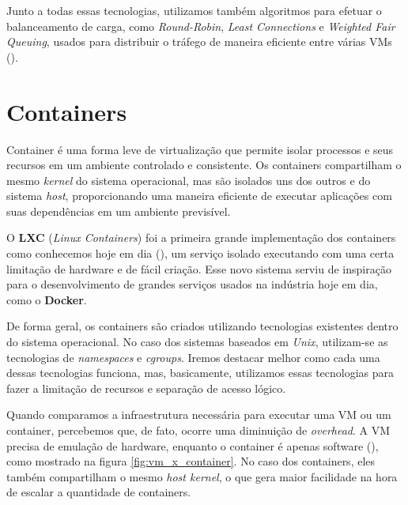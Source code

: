 Junto a todas essas tecnologias, utilizamos também algoritmos para efetuar o balanceamento de carga, como \textit{Round-Robin}, \textit{Least Connections} e \textit{Weighted Fair Queuing}, usados para distribuir o tráfego de maneira eficiente entre várias VMs (\cite{dong2012high}).


\section{Containers}

Container é uma forma leve de virtualização que permite isolar processos e seus recursos em um ambiente controlado e consistente. Os containers compartilham o mesmo \textit{kernel} do sistema operacional, mas são isolados uns dos outros e do sistema \textit{host}, proporcionando uma maneira eficiente de executar aplicações com suas dependências em um ambiente previsível.

O \textbf{LXC} (\textit{Linux Containers}) foi a primeira grande implementação dos containers como conhecemos hoje em dia (\cite{HistoryOfCloudByIBM}), um serviço isolado executando com uma certa limitação de hardware e de fácil criação. Esse novo sistema serviu de inspiração para o desenvolvimento de grandes serviços usados na indústria hoje em dia, como o \textbf{Docker}.

De forma geral, os containers são criados utilizando tecnologias existentes dentro do sistema operacional. No caso dos sistemas baseados em \textit{Unix}, utilizam-se as tecnologias de \textit{namespaces} e \textit{cgroups}. Iremos destacar melhor como cada uma dessas tecnologias funciona, mas, basicamente, utilizamos essas tecnologias para fazer a limitação de recursos e separação de acesso lógico.

Quando comparamos a infraestrutura necessária para executar uma VM ou um container, percebemos que, de fato, ocorre uma diminuição de \textit{overhead}. A VM precisa de emulação de hardware, enquanto o container é apenas software (\cite{OCIContainer}), como mostrado na figura \ref{fig:vm_x_container}. No caso dos containers, eles também compartilham o mesmo \textit{host kernel}, o que gera maior facilidade na hora de escalar a quantidade de containers.


